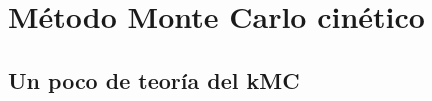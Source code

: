 \documentclass[12pt,letterpaper,oneside]{report}
\begin{document}


\chapter{Método Monte Carlo cinético}

\section{Un poco de teoría del kMC}\label{sec:kMC_theory}
\end{document}
